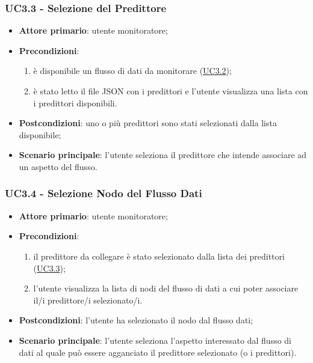 		\label{par:UC3.3}
		\subsubsection{UC3.3 - Selezione del Predittore}
		\begin{itemize}
			\item\textbf{Attore primario}: utente monitoratore;
			\item\textbf{Precondizioni}: 
				\begin{enumerate}
					\item è disponibile un flusso di dati da monitorare (\hyperref[par:UC3.2]{UC3.2}); 
					\item è stato letto il file JSON con i predittori e l'utente visualizza una lista con i predittori disponibili.
				\end{enumerate}
			\item\textbf{Postcondizioni}: uno o più predittori sono stati selezionati dalla lista disponibile;
			\item\textbf{Scenario principale}: l’utente seleziona il predittore che intende associare ad un aspetto del flusso.
		\end{itemize}
	
	\label{par:UC3.4}
	\subsubsection{UC3.4 - Selezione Nodo del Flusso Dati}
		\begin{itemize}
			\item\textbf{Attore primario}: utente monitoratore;
			\item\textbf{Precondizioni}:
				\begin{enumerate}
					\item il predittore da collegare è stato selezionato dalla lista dei predittori (\hyperref[par:UC3.3]{UC3.3});
					\item l’utente visualizza la lista di nodi del flusso di dati a cui poter associare il/i predittore/i selezionato/i.
				\end{enumerate}
			\item\textbf{Postcondizioni}: l'utente ha selezionato il nodo dal flusso dati;
			\item\textbf{Scenario principale}: l’utente seleziona l’aspetto interessato dal flusso di dati al quale può essere agganciato il predittore selezionato (o i predittori).
		\end{itemize}

	\label{par:UC3.5}
